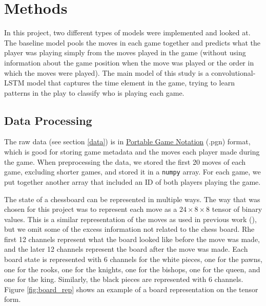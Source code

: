 \section{Methods}
In this project, two different types of models were implemented and looked at. The baseline model pools the moves in each game together and predicts what the player was playing simply from the moves played in the game (without using information about the game position when the move was played or the order in which the moves were played). The main model of this study is a convolutional-LSTM model that captures the time element in the game, trying to learn patterns in the play to classify who is playing each game.

\subsection{Data Processing}
The raw data (see section \ref{data}) is in \href{https://en.wikipedia.org/wiki/Portable_Game_Notation}{Portable Game Notation} (.pgn) format, which is good for storing game metadata and the moves each player made during the game. When preprocessing the data, we stored the first 20 moves of each game, excluding shorter games, and stored it in a \verb$numpy$ array. For each game, we put together another array that included an ID of both players playing the game.
\medskip\par
The state of a chessboard can be represented in multiple ways. The way that was chosen for this project was to represent each move as a $24 \times 8 \times 8$ tensor of binary values. This is a similar representation of the moves as used in previous work (\citealp{main_article}), but we omit some of the excess information not related to the chess board.
Rhe first 12 channels represent what the board looked like before the move was made, and the later 12 channels represent the board after the move was made. Each board state is represented with 6 channels for the white pieces, one for the pawns, one for the rooks, one for the knights, one for the bishops, one for the queen, and one for the king. Similarly, the black pieces are represented with 6 channels. Figure \ref{fig:board_rep} shows an example of a board representation on the tensor form.

